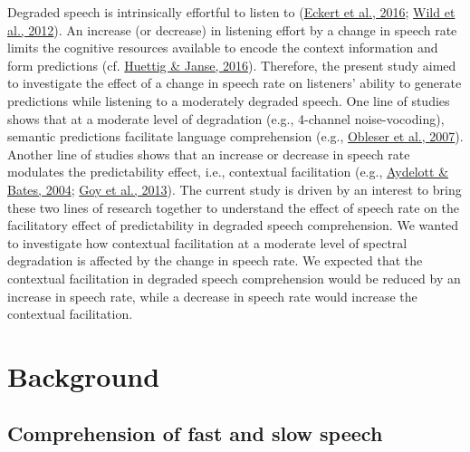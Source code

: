 \documentclass[a4paper, nobind]{templates/ociamthesis}
\begin{document}
Degraded speech is intrinsically effortful to listen to (\protect\hyperlink{ref-Eckert2016}{Eckert et al., 2016}; \protect\hyperlink{ref-Wild2012}{Wild et al., 2012}).
An increase (or decrease) in listening effort by a change in speech rate limits the cognitive resources available to encode the context information and form predictions (cf. \protect\hyperlink{ref-Huettig2016a}{Huettig \& Janse, 2016}).
Therefore, the present study aimed to investigate the effect of a change in speech rate on listeners' ability to generate predictions while listening to a moderately degraded speech.
One line of studies shows that at a moderate level of degradation (e.g., 4-channel noise-vocoding), semantic predictions facilitate language comprehension (e.g., \protect\hyperlink{ref-Obleser2007}{Obleser et al., 2007}).
Another line of studies shows that an increase or decrease in speech rate modulates the predictability effect, i.e., contextual facilitation (e.g., \protect\hyperlink{ref-Aydelott2004}{Aydelott \& Bates, 2004}; \protect\hyperlink{ref-Goy2013}{Goy et al., 2013}).
The current study is driven by an interest to bring these two lines of research together to understand the effect of speech rate on the facilitatory effect of predictability in degraded speech comprehension.
We wanted to investigate how contextual facilitation at a moderate level of spectral degradation is affected by the change in speech rate.
We expected that the contextual facilitation in degraded speech comprehension would be reduced by an increase in speech rate, while a decrease in speech rate would increase the contextual facilitation.

\hypertarget{background-2}{%
\section{Background}\label{background-2}}

\hypertarget{comprehension-of-fast-and-slow-speech}{%
\subsection{Comprehension of fast and slow speech}\label{comprehension-of-fast-and-slow-speech}}
\end{document}
